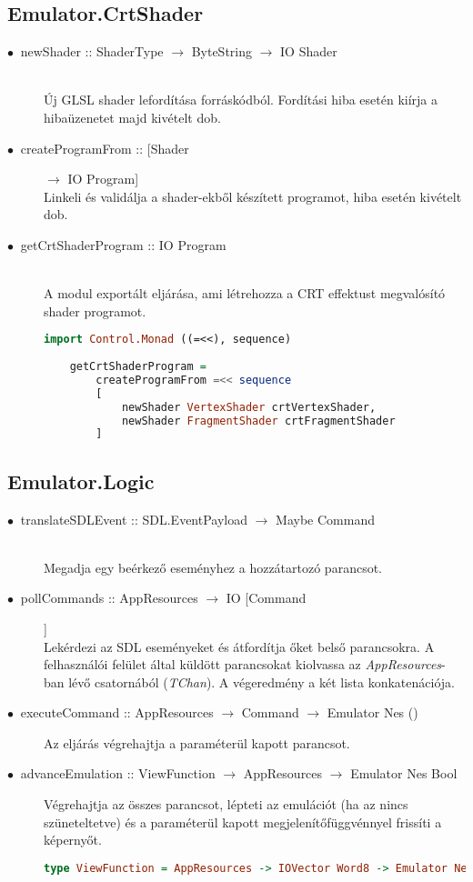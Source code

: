 \subsection{Emulator.CrtShader}

\begin{description}
	\item[$\bullet\:$ newShader :: ShaderType $\rightarrow$ ByteString $\rightarrow$ IO Shader] \hfill \\
	Új GLSL shader lefordítása forráskódból. Fordítási hiba esetén kiírja a hibaüzenetet majd kivételt dob.
	\item[$\bullet\:$ createProgramFrom :: [Shader] $\rightarrow$ IO Program] \hfill \\
	Linkeli és validálja a shader-ekből készített programot, hiba esetén kivételt dob.
	\item[$\bullet\:$ getCrtShaderProgram :: IO Program] \hfill \\
	A modul exportált eljárása, ami létrehozza a CRT effektust megvalósító shader programot.
	\begin{lstlisting}[language=Haskell, basicstyle=\scriptsize]
	import Control.Monad ((=<<), sequence)
	
	getCrtShaderProgram = 
		createProgramFrom =<< sequence 
		[
			newShader VertexShader crtVertexShader, 
			newShader FragmentShader crtFragmentShader
		]
	\end{lstlisting}
\end{description}

\subsection{Emulator.Logic}

\begin{description}
	\item[$\bullet\:$ translateSDLEvent :: SDL.EventPayload $\rightarrow$ Maybe Command] \hfill \\
	Megadja egy beérkező eseményhez a hozzátartozó parancsot.
	\item[$\bullet\:$ pollCommands :: AppResources $\rightarrow$ IO [Command]] \hfill \\
	Lekérdezi az SDL eseményeket és átfordítja őket belső parancsokra. A felhasználói felület által küldött parancsokat kiolvassa az \emph{AppResources}-ban lévő csatornából (\emph{TChan}). A végeredmény a két lista konkatenációja. 
	\item[$\bullet\:$ executeCommand :: AppResources $\rightarrow$ Command $\rightarrow$ Emulator Nes ()] \hfill
	Az eljárás végrehajtja a paraméterül kapott parancsot.
	\item[$\bullet\:$ advanceEmulation :: ViewFunction $\rightarrow$ AppResources $\rightarrow$ Emulator Nes Bool] \hfill
	Végrehajtja az összes parancsot, lépteti az emulációt (ha az nincs szüneteltetve) és a paraméterül kapott megjelenítőfüggvénnyel frissíti a képernyőt.
	\begin{lstlisting}[language=Haskell, basicstyle=\scriptsize]
	type ViewFunction = AppResources -> IOVector Word8 -> Emulator Nes ()
	\end{lstlisting}
\end{description}

